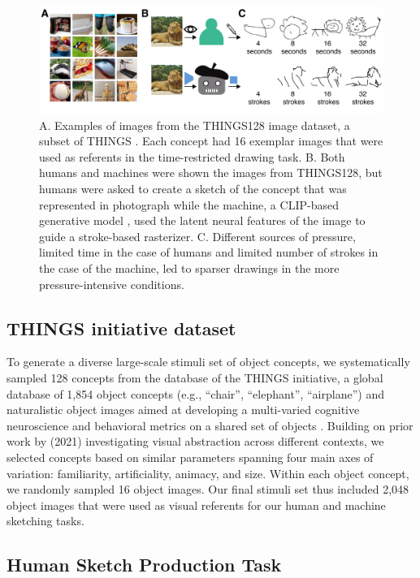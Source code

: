 \documentclass[10pt,letterpaper]{article}
\begin{document}
\begin{figure}
    \centering
    \includegraphics[width= 1\linewidth]{figures/VAB_task.pdf}
 
    \caption{A. Examples of images from the THINGS128 image dataset, a subset of THINGS \cite{hebart2019things}. Each concept had 16 exemplar images that were used as referents in the time-restricted drawing task. B. Both humans and machines were shown the images from THINGS128, but humans were asked to create a sketch of the concept that was represented in photograph while the machine, a CLIP-based generative model \cite{vinker2022clipasso}, used the latent neural features of the image to guide a stroke-based rasterizer. C. Different sources of pressure, limited time in the case of humans and limited number of strokes in the case of the machine, led to sparser drawings in the more pressure-intensive conditions.}

    \label{fig:trial}
\end{figure}

\subsection{THINGS initiative dataset}
To generate a diverse large-scale stimuli set of object concepts, we systematically sampled 128 concepts from the database of the THINGS initiative, a global database of 1,854 object concepts (e.g., ``chair'', ``elephant'', ``airplane'') and naturalistic object images aimed at developing a multi-varied cognitive neuroscience and behavioral metrics on a shared set of objects \cite{hebart2019things}. 
Building on prior work by \citeauthor{yang2021visual} (2021) investigating visual abstraction across different contexts, we selected concepts based on similar parameters spanning four main axes of variation: familiarity, artificiality, animacy, and size. 
Within each object concept, we randomly sampled 16 object images. 
Our final stimuli set thus included 2,048 object images that were used as visual referents for our human and machine sketching tasks.

\subsection{Human Sketch Production Task} 
\end{document}
